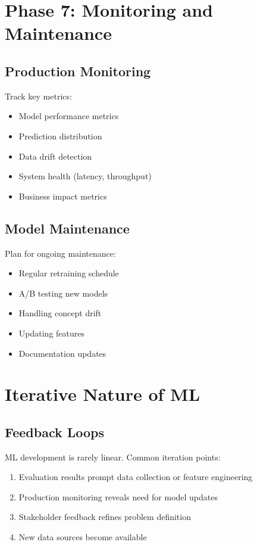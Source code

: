 \section{Phase 7: Monitoring and Maintenance}

\subsection{Production Monitoring}

Track key metrics:

\begin{itemize}
    \item Model performance metrics
    \item Prediction distribution
    \item Data drift detection
    \item System health (latency, throughput)
    \item Business impact metrics
\end{itemize}

\subsection{Model Maintenance}

Plan for ongoing maintenance:

\begin{itemize}
    \item Regular retraining schedule
    \item A/B testing new models
    \item Handling concept drift
    \item Updating features
    \item Documentation updates
\end{itemize}

\section{Iterative Nature of ML}

\subsection{Feedback Loops}

ML development is rarely linear. Common iteration points:

\begin{enumerate}
    \item Evaluation results prompt data collection or feature engineering
    \item Production monitoring reveals need for model updates
    \item Stakeholder feedback refines problem definition
    \item New data sources become available
\end{enumerate}

